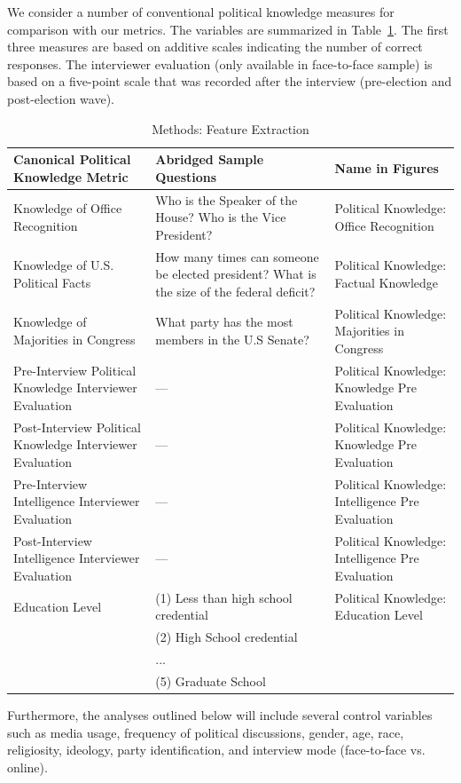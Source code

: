 \documentclass[12pt]{article}
\begin{document}
We consider a number of conventional political knowledge measures for comparison with our metrics. The variables are summarized in Table~\ref{tab:featextr}. The first three measures are based on additive scales indicating the number of correct responses. The interviewer evaluation (only available in face-to-face sample) is based on a five-point scale that was recorded after the interview (pre-election and post-election wave).

\begin{table}\onehalfspacing\footnotesize
\begin{tabular}{p{5.5cm}p{5.5cm}p{5.5cm}}
\hline
Canonical Political Knowledge Metric &	Abridged Sample Questions &	Name in Figures \\
\hline
Knowledge of Office Recognition  	  & Who is the Speaker of the House? Who is the Vice President? &  Political Knowledge: Office Recognition \\ 
Knowledge of U.S. Political Facts 	 & How many times can someone be elected president? What is the size of the federal deficit? & Political Knowledge: Factual Knowledge\\
Knowledge of Majorities in Congress & What party has the most members in the U.S Senate? & Political Knowledge: Majorities in Congress\\
Pre-Interview Political Knowledge Interviewer Evaluation & --- & Political Knowledge: Knowledge Pre Evaluation\\
Post-Interview Political Knowledge Interviewer Evaluation & --- & Political Knowledge: Knowledge Pre Evaluation\\
Pre-Interview Intelligence Interviewer Evaluation & --- & Political Knowledge: Intelligence Pre Evaluation\\
Post-Interview Intelligence Interviewer Evaluation & --- & Political Knowledge: Intelligence Pre Evaluation\\
Education Level 	 & (1) Less than high school credential&Political Knowledge: Education Level \\
&(2) High School credential&\\
&...&\\
&(5) Graduate School & \\
\hline 
\end{tabular} 
\caption{Methods: Feature Extraction}\label{tab:featextr}
\end{table}

Furthermore, the analyses outlined below will include several control variables such as media usage, frequency of political discussions, gender, age, race, religiosity, ideology, party identification, and interview mode (face-to-face vs. online).
	
\end{document}
